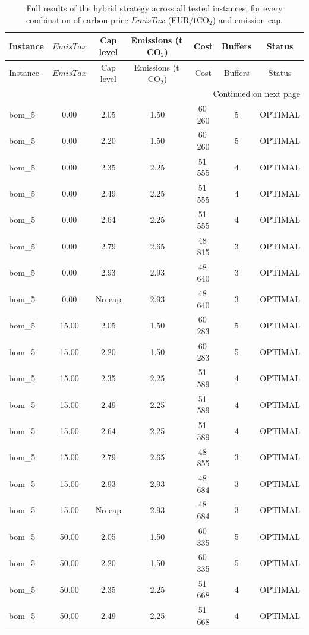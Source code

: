 \begingroup\scriptsize
\setlength{\tabcolsep}{3pt}
\begin{longtable}{lcccccc}
\caption{Full results of the hybrid strategy across all tested instances, for every combination of carbon price $EmisTax$ (EUR/tCO$_2$) and emission cap.}\label{tab:hybridfull}\\
\toprule
Instance & $EmisTax$ & Cap level & Emissions (t\,CO$_2$) & Cost & Buffers & Status\\
\midrule
\endfirsthead
\toprule
Instance & $EmisTax$ & Cap level & Emissions (t\,CO$_2$) & Cost & Buffers & Status\\
\midrule
\endhead
\midrule
\multicolumn{7}{r}{Continued on next page}\\
\endfoot
\bottomrule
\endlastfoot
bom\_5 & 0.00 & 2.05 & 1.50 & 60\,260 & 5 & OPTIMAL \\
bom\_5 & 0.00 & 2.20 & 1.50 & 60\,260 & 5 & OPTIMAL \\
bom\_5 & 0.00 & 2.35 & 2.25 & 51\,555 & 4 & OPTIMAL \\
bom\_5 & 0.00 & 2.49 & 2.25 & 51\,555 & 4 & OPTIMAL \\
bom\_5 & 0.00 & 2.64 & 2.25 & 51\,555 & 4 & OPTIMAL \\
bom\_5 & 0.00 & 2.79 & 2.65 & 48\,815 & 3 & OPTIMAL \\
bom\_5 & 0.00 & 2.93 & 2.93 & 48\,640 & 3 & OPTIMAL \\
bom\_5 & 0.00 & No cap & 2.93 & 48\,640 & 3 & OPTIMAL \\
bom\_5 & 15.00 & 2.05 & 1.50 & 60\,283 & 5 & OPTIMAL \\
bom\_5 & 15.00 & 2.20 & 1.50 & 60\,283 & 5 & OPTIMAL \\
bom\_5 & 15.00 & 2.35 & 2.25 & 51\,589 & 4 & OPTIMAL \\
bom\_5 & 15.00 & 2.49 & 2.25 & 51\,589 & 4 & OPTIMAL \\
bom\_5 & 15.00 & 2.64 & 2.25 & 51\,589 & 4 & OPTIMAL \\
bom\_5 & 15.00 & 2.79 & 2.65 & 48\,855 & 3 & OPTIMAL \\
bom\_5 & 15.00 & 2.93 & 2.93 & 48\,684 & 3 & OPTIMAL \\
bom\_5 & 15.00 & No cap & 2.93 & 48\,684 & 3 & OPTIMAL \\
bom\_5 & 50.00 & 2.05 & 1.50 & 60\,335 & 5 & OPTIMAL \\
bom\_5 & 50.00 & 2.20 & 1.50 & 60\,335 & 5 & OPTIMAL \\
bom\_5 & 50.00 & 2.35 & 2.25 & 51\,668 & 4 & OPTIMAL \\
bom\_5 & 50.00 & 2.49 & 2.25 & 51\,668 & 4 & OPTIMAL \\

\end{longtable}
